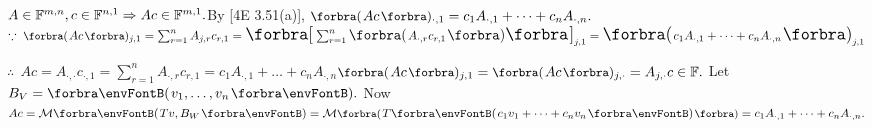 \BulletPointX{}\;\;$A\in{\mathbb{F}}^{m,n},c\in{\mathbb{F}}^{n,1}\Rightarrow Ac\in{\mathbb{F}}^{m,1}.$\hfill By [4E 3.51(a)], $\BigPar{Ac}{_{\cdot,1}}=c_1A_{\cdot,1}+\dots+c_nA_{\cdot,n}.$\;\;\!\,\PfEnd\vspace{4pt}\quad
\Or $\because\;\BigPar{Ac}{_{j,1}}=\sum_{r=1}^n A_{j,r}c_{r,1}=\envFontLarge\Sbra{\envFontDefault\sum_{r=1}^n\BigPar{A_{\cdot,r}c_{r,1}}\envFontLarge}_{j,1}=\BigPar{c_1 A_{\cdot,1}+\dots+c_n A_{\cdot,n}}_{j,1}$\vspace{1pt}\par\quad
\Blind{\Or}$\therefore\;\,Ac=A_{\cdot,\cdot}c_{\cdot,1}=\sum_{r=1}^n A_{\cdot,r}c_{r,1}=c_1 A_{\cdot,1}+\dots+c_n A_{\cdot,n}$\;\;\Or $\BigPar{Ac}{_{j,1}}=\BigPar{Ac}{_{j,\cdot}}=A_{j,\cdot}c\in\Fbb.$\PfEnd\vspace{2pt}\quad
\Or Let $B_V=\Par{v_1,\dots,v_n}.$ Now $Ac=\Mt{Tv,B_W}=\Mt[\BigPar]{T\Par{c_1v_1+\dots+c_nv_n}}=c_1A_{\cdot,1}+\dots+c_nA_{\cdot,n}.$\PfEnd
\SepLine

